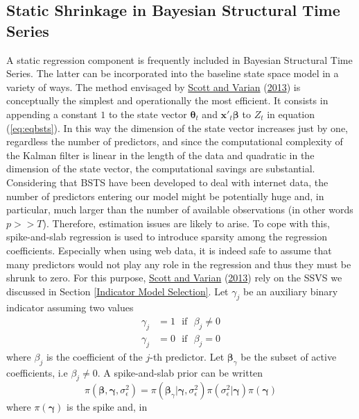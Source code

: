 \documentclass[
  12pt,
]{book}
\theoremstyle{break}
\theoremstyle{nonumberplain}
\begin{document}
\subsection{Static Shrinkage in Bayesian Structural Time Series}\label{Static Shrinkage in Bayesian Structural Time Series}

A static regression component is frequently included in Bayesian
Structural Time Series. The latter can be incorporated into the baseline
state space model in a variety of ways. The method envisaged by
\protect\hyperlink{ref-scott_varian_2013}{Scott and Varian}
(\protect\hyperlink{ref-scott_varian_2013}{2013}) is conceptually the
simplest and operationally the most efficient. It consists in appending
a constant \(1\) to the state vector \(\boldsymbol{\theta}_{t}\) and
\(\boldsymbol{x}'_{t}\boldsymbol{\beta}\) to \(Z_{t}\) in equation
(\ref{eq:eqbsts}). In this way the dimension of the state vector
increases just by one, regardless the number of predictors, and since
the computational complexity of the Kalman filter is linear in the
length of the data and quadratic in the dimension of the state vector,
the computational savings are substantial. Considering that BSTS have
been developed to deal with internet data, the number of predictors
entering our model might be potentially huge and, in particular, much
larger than the number of available observations (in other words
\(p>>T\)). Therefore, estimation issues are likely to arise. To cope
with this, spike-and-slab regression is used to introduce sparsity among
the regression coefficients. Especially when using web data, it is
indeed safe to assume that many predictors would not play any role in
the regression and thus they must be shrunk to zero. For this purpose,
\protect\hyperlink{ref-scott_varian_2013}{Scott and Varian}
(\protect\hyperlink{ref-scott_varian_2013}{2013}) rely on the SSVS we
discussed in Section \ref{Indicator Model Selection}. Let \(\gamma_{j}\)
be an auxiliary binary indicator assuming two values \begin{align*}
\gamma_{j} & = 1 \ \ \ \text{if} \ \ \ \beta_{j} \neq 0 \\
\gamma_{j} & = 0  \ \ \ \text{if} \ \ \ \beta_{j}=0
\end{align*} where \(\beta_{j}\) is the coefficient of the \(j\)-th
predictor. Let \(\boldsymbol\beta_{\gamma}\) be the subset of active
coefficients, i.e \(\beta_{j} \neq 0\). A spike-and-slab prior can be
written \begin{equation*}
\pi(\boldsymbol{\beta},\boldsymbol{\gamma},\sigma^{2}_{\epsilon})=\pi(\boldsymbol{\beta}_{\gamma}|\boldsymbol{\gamma},\sigma^{2}_{\epsilon})\pi(\sigma^{2}_{\epsilon}|\boldsymbol{\gamma})\pi(\boldsymbol{\gamma})
\end{equation*} where \(\pi(\boldsymbol{\gamma})\) is the spike and, in
\end{document}
